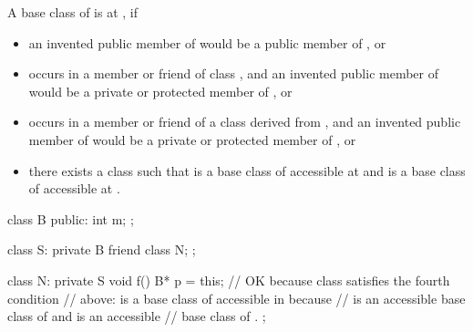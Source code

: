 \pnum
A base class
of
is
at
,
if
\begin{itemize}
\item
an invented public member of
would be a public member of
, or
\item
{}
occurs in a member or friend of class
,
and an invented public member of
would be a private or protected member of
, or
\item
{}
occurs in a member or friend of a class
derived from
,
and an invented public member of
would be a private or protected member of
, or
\item
there exists a class
such that
is a base class of
accessible at
and
is a base class of
accessible at
.
\end{itemize}

\enterexample
\begin{codeblock}
class B {
public:
  int m;
};

class S: private B {
  friend class N;
};

class N: private S {
  void f() {
    B* p = this;    // OK because class  satisfies the fourth condition
                    // above:  is a base class of  accessible in  because
                    //  is an accessible base class of  and  is an accessible
                    // base class of .
  }
};
\end{codeblock}
\exitexample

